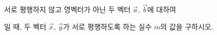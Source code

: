 서로 평행하지 않고 영벡터가 아닌 두 벡터 $\vec{a}$, $\vec{b}$에 대하여 \par\smallskip{}\par\smallskip\noindent 일 때, 두 벡터 $\vec{x}$, $\vec{y}$가 서로 평행하도록 하는 실수 $m$의 값을 구하시오.
